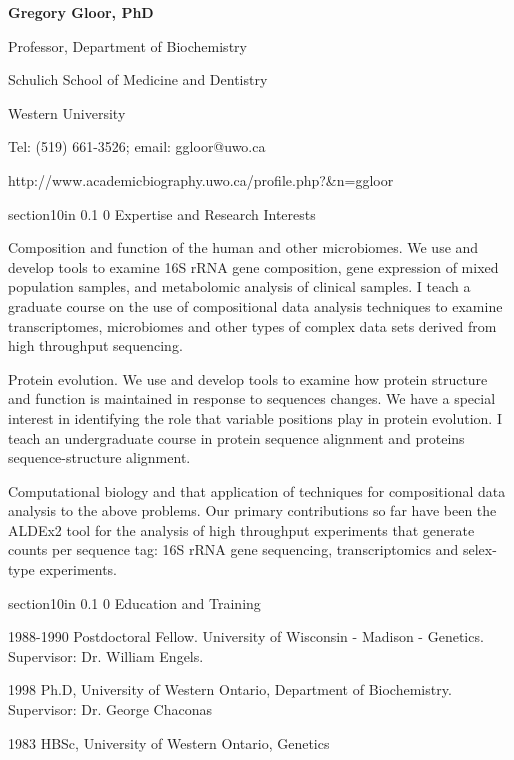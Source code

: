 \documentclass[11pt]{article}
\makeatletter
\renewcommand\section{\@startsection
	{section}{1}{0in}%
	{0.1\baselineskip}%
	{0\baselineskip}%
	{\sffamily\bfseries\large}
}
\makeatother
\begin{document}
\begin{center}
\textbf{Gregory Gloor, PhD}

Professor, Department of Biochemistry

Schulich School of Medicine and Dentistry

Western University

Tel: (519) 661-3526; email: ggloor@uwo.ca 
 
http://www.academicbiography.uwo.ca/profile.php?\&n=ggloor
\end{center}
\section{Expertise and Research Interests}
\begin{description}\itemsep=-2pt
\item Composition and function of the human and other microbiomes. We use and develop tools to examine 16S rRNA gene composition, gene expression of mixed population samples, and metabolomic analysis of clinical samples. I teach a graduate course on the use of compositional data analysis techniques to examine transcriptomes, microbiomes and other types of complex data sets derived from high throughput sequencing. 
\item Protein evolution. We use and develop tools to examine how protein structure and function is maintained in response to sequences changes. We have a special interest in identifying the role that variable positions play in protein evolution. I teach an undergraduate course in protein sequence alignment and proteins sequence-structure alignment. 
\item Computational biology and that application of techniques for compositional data analysis to the above problems. Our primary contributions so far have been the ALDEx2 tool for the analysis of high throughput experiments that generate counts per sequence tag: 16S rRNA gene sequencing, transcriptomics and selex-type experiments.
\end{description}

\section{Education and Training}
\begin{description}\itemsep=-2pt
\item 1988-1990  Postdoctoral Fellow.  University of Wisconsin - Madison - Genetics. Supervisor: Dr. William Engels.
\item 1998  Ph.D, University of Western Ontario, Department of Biochemistry. Supervisor: Dr. George Chaconas
\item 1983  HBSc, University of Western Ontario, Genetics
\end{description}
\end{document}
